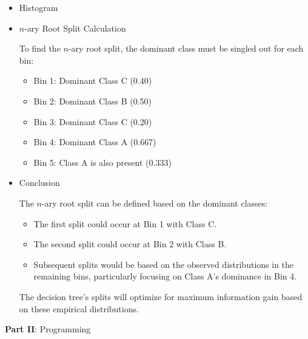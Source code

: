\documentclass[12pt]{article}
\begin{document}
\begin{enumerate}[leftmargin=\labelsep, label=\textbf{\arabic*.)}]
\begin{itemize}
              \item Histogram

              \item $n$-ary Root Split Calculation

                    To find the $n$-ary root split, the dominant class must be singled out for each bin:

                    \begin{itemize}
                        \item Bin 1: Dominant Class C (0.40)
                        \item Bin 2: Dominant Class B (0.50)
                        \item Bin 3: Dominant Class C (0.20)
                        \item Bin 4: Dominant Class A (0.667)
                        \item Bin 5: Class A is also present (0.333)
                    \end{itemize}

              \item Conclusion

                    The \( n \)-ary root split can be defined based on the dominant classes:

                    \begin{itemize}
                        \item The first split could occur at Bin 1 with Class C.
                        \item The second split could occur at Bin 2 with Class B.
                        \item Subsequent splits would be based on the observed distributions in the remaining bins, particularly focusing on Class A’s dominance in Bin 4.
                    \end{itemize}

                    The decision tree's splits will optimize for maximum information gain based on these empirical distributions.

          \end{itemize}
\end{enumerate}

\large{\textbf{Part II}: Programming}\normalsize
\end{document}
